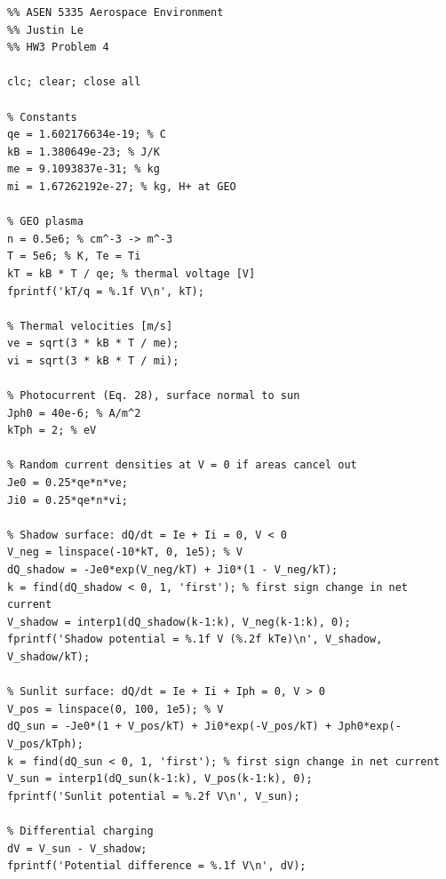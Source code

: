 \documentclass[11pt]{article}
\begin{document}
\newpage
\begin{lstlisting}
%% ASEN 5335 Aerospace Environment
%% Justin Le
%% HW3 Problem 4

clc; clear; close all

% Constants
qe = 1.602176634e-19; % C
kB = 1.380649e-23; % J/K
me = 9.1093837e-31; % kg
mi = 1.67262192e-27; % kg, H+ at GEO

% GEO plasma
n = 0.5e6; % cm^-3 -> m^-3
T = 5e6; % K, Te = Ti
kT = kB * T / qe; % thermal voltage [V]
fprintf('kT/q = %.1f V\n', kT);

% Thermal velocities [m/s]
ve = sqrt(3 * kB * T / me);
vi = sqrt(3 * kB * T / mi);

% Photocurrent (Eq. 28), surface normal to sun
Jph0 = 40e-6; % A/m^2
kTph = 2; % eV

% Random current densities at V = 0 if areas cancel out
Je0 = 0.25*qe*n*ve;
Ji0 = 0.25*qe*n*vi;

% Shadow surface: dQ/dt = Ie + Ii = 0, V < 0
V_neg = linspace(-10*kT, 0, 1e5); % V
dQ_shadow = -Je0*exp(V_neg/kT) + Ji0*(1 - V_neg/kT);
k = find(dQ_shadow < 0, 1, 'first'); % first sign change in net current
V_shadow = interp1(dQ_shadow(k-1:k), V_neg(k-1:k), 0);
fprintf('Shadow potential = %.1f V (%.2f kTe)\n', V_shadow, V_shadow/kT);

% Sunlit surface: dQ/dt = Ie + Ii + Iph = 0, V > 0
V_pos = linspace(0, 100, 1e5); % V
dQ_sun = -Je0*(1 + V_pos/kT) + Ji0*exp(-V_pos/kT) + Jph0*exp(-V_pos/kTph);
k = find(dQ_sun < 0, 1, 'first'); % first sign change in net current
V_sun = interp1(dQ_sun(k-1:k), V_pos(k-1:k), 0);
fprintf('Sunlit potential = %.2f V\n', V_sun);

% Differential charging
dV = V_sun - V_shadow;
fprintf('Potential difference = %.1f V\n', dV);
\end{lstlisting}
\end{document}
